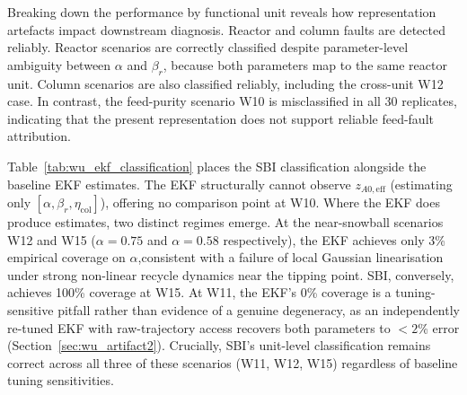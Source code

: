 \documentclass[aps,pre,twocolumn,superscriptaddress,floatfix]{revtex4-2}
\begin{document}
Breaking down the performance by functional unit reveals how representation 
artefacts impact downstream diagnosis. 
Reactor and column faults are detected reliably. Reactor scenarios are correctly classified despite parameter-level ambiguity between $\alpha$ and $\beta_r$, because both parameters map to the same reactor unit. Column scenarios are also classified reliably, including the cross-unit W12 case. In contrast, the feed-purity scenario W10 is misclassified in all 30 replicates, indicating that the present representation does not support reliable feed-fault attribution.

Table~\ref{tab:wu_ekf_classification} places the SBI classification alongside 
the baseline EKF estimates. The EKF structurally cannot observe $z_{A0,\mathrm{eff}}$ 
(estimating only $[\alpha,\beta_r,\eta_\mathrm{col}]$), offering no comparison point at W10. 
Where the EKF does produce estimates, two distinct regimes emerge. At the 
near-snowball scenarios W12 and W15 ($\alpha = 0.75$ and $\alpha = 0.58$ respectively), 
the EKF achieves only 3\% empirical coverage on $\alpha$,consistent with a failure of local Gaussian linearisation under strong non-linear recycle dynamics near the tipping point. SBI, conversely, achieves 100\% coverage at W15. 
At W11, the EKF's 0\% coverage is a tuning-sensitive pitfall rather than evidence 
of a genuine degeneracy, as an independently re-tuned EKF with raw-trajectory 
access recovers both parameters to $<2$\% error (Section~\ref{sec:wu_artifact2}). 
Crucially, SBI's unit-level classification remains correct across all three of these 
scenarios (W11, W12, W15) regardless of baseline tuning sensitivities.
\end{document}
